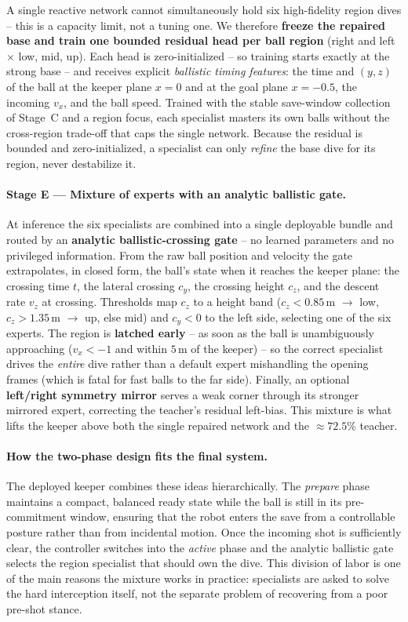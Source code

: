 \documentclass{article}
\begin{document}
A single reactive network cannot simultaneously hold six high-fidelity region
dives -- this is a capacity limit, not a tuning one. We therefore \textbf{freeze
the repaired base and train one bounded residual head per ball region} (right and
left $\times$ low, mid, up). Each head is
zero-initialized -- so training starts exactly at the strong base -- and receives
explicit \emph{ballistic timing features}: the time and $(y,z)$ of the ball at
the keeper plane $x=0$ and at the goal plane $x=-0.5$, the incoming $v_x$, and the
ball speed. Trained with the stable save-window collection of Stage~C and a region
focus, each specialist masters its own balls
without the cross-region trade-off that caps the single network. Because the
residual is bounded and zero-initialized, a specialist can only \emph{refine} the
base dive for its region, never destabilize it.

\paragraph{Stage E --- Mixture of experts with an analytic ballistic gate.}

At inference the six specialists are combined into a single deployable bundle
and routed by an \textbf{analytic ballistic-crossing gate} -- no learned parameters and no
privileged information. From the raw ball position and velocity the gate
extrapolates, in closed form, the ball's state when it reaches the keeper plane:
the crossing time $t$, the lateral crossing $c_y$, the crossing height $c_z$, and
the descent rate $v_z$ at crossing. Thresholds map $c_z$ to a height band
($c_z<0.85$\,m $\to$ low, $c_z>1.35$\,m $\to$ up, else mid) and $c_y<0$ to the
left side, selecting one of the six experts. The region is \textbf{latched early}
-- as soon as the ball is unambiguously approaching ($v_x<-1$ and within
$5$\,m of the keeper) -- so the correct specialist drives the \emph{entire} dive
rather than a default expert mishandling the opening frames (which is fatal for
fast balls to the far side). Finally, an optional \textbf{left/right symmetry
mirror} serves a weak corner through its stronger mirrored expert, correcting
the teacher's residual left-bias. This mixture is
what lifts the keeper above both the single repaired network and the
$\approx 72.5\%$ teacher.

\paragraph{How the two-phase design fits the final system.} The deployed keeper
combines these ideas hierarchically. The \emph{prepare} phase maintains a
compact, balanced ready state while the ball is still in its pre-commitment
window, ensuring that the robot enters the save from a controllable posture
rather than from incidental motion. Once the incoming shot is sufficiently
clear, the controller switches into the \emph{active} phase and the analytic
ballistic gate selects the region specialist that should own the dive. This
division of labor is one of the main reasons the mixture works in practice:
specialists are asked to solve the hard interception itself, not the separate
problem of recovering from a poor pre-shot stance.
\end{document}
